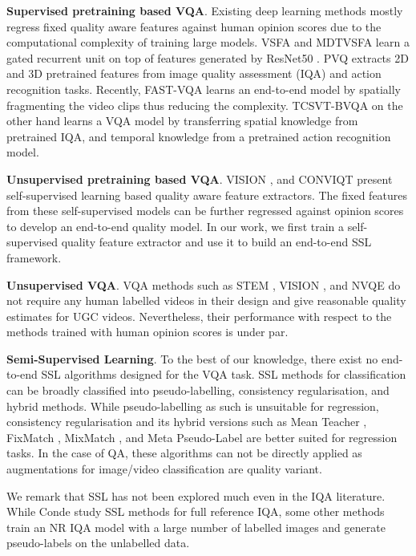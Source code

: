 \documentclass[10pt,twocolumn,letterpaper]{article}
\begin{document}
\textbf{Supervised pretraining based VQA}. Existing deep learning methods mostly regress fixed quality aware features against human opinion scores due to the computational complexity of training large models. VSFA \cite{qa_in_the_wild} and MDTVSFA \cite{mdtvsfa} learn a gated recurrent unit on top of features generated by ResNet50 \cite{resnet}. PVQ \cite{patchVQ} extracts 2D and 3D pretrained features from image quality assessment (IQA) and action recognition tasks. Recently, FAST-VQA \cite{fastVQA} learns an end-to-end model by spatially fragmenting the video clips thus reducing the complexity. TCSVT-BVQA \cite{csvt_bvqa} on the other hand learns a VQA model by transferring spatial knowledge from pretrained IQA, and temporal knowledge from a pretrained action recognition model. 

\textbf{Unsupervised pretraining based VQA}. VISION \cite{vision}, and CONVIQT \cite{CONVIQT} present self-supervised learning based quality aware feature extractors. The fixed features from these self-supervised models can be further regressed against opinion scores to develop an end-to-end quality model. In our work, we first train a self-supervised quality feature extractor and use it to build an end-to-end SSL framework.

\textbf{Unsupervised VQA}. VQA methods such as STEM \cite{STEM}, VISION \cite{vision}, and NVQE \cite{NVQE} do not require any human labelled videos in their design and give reasonable quality estimates for UGC videos. Nevertheless, their performance with respect to the methods trained with human opinion scores is under par.

\textbf{Semi-Supervised Learning}. To the best of our knowledge, there exist no end-to-end SSL algorithms designed for the VQA task. SSL methods for classification can be broadly classified into pseudo-labelling, consistency regularisation, and hybrid methods. While pseudo-labelling as such is unsuitable for regression, consistency regularisation and its hybrid versions such as Mean Teacher \cite{mean_teach}, FixMatch \cite{fixmatch}, MixMatch \cite{mixmatch}, and Meta Pseudo-Label \cite{mpl} are better suited for regression tasks. In the case of QA, these algorithms can not be directly applied as augmentations for image/video classification are quality variant. 

We remark that SSL has not been explored much even in the IQA literature. While Conde \etal \cite{semi_iqa_conformer} study SSL methods for full reference IQA, some other methods \cite{semi_iqa_kedema, sslIQA} train an NR IQA model with a large number of labelled images and generate pseudo-labels on the unlabelled data. 
\end{document}
